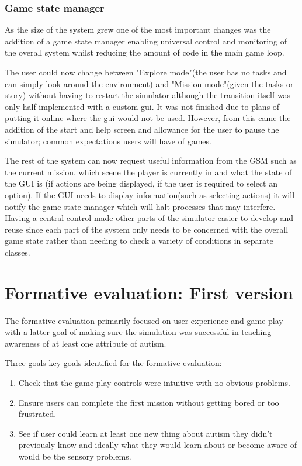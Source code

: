 \documentclass[11pt]{report}
\begin{document}
\subsection{Game state manager}

As the size of the system grew one of the most important changes was the addition of a game state manager enabling universal control and monitoring of the overall system whilst reducing the amount of code in the main game loop. 

The user could now change between "Explore mode"(the user has no tasks and can simply look around the environment) and "Mission mode"(given the tasks or story) without having to restart the simulator although the transition itself was only half implemented with a custom gui. It was not finished due to plans of putting it online where the gui would not be used. However, from this came the addition of the start and help screen and allowance for the user to pause the simulator; common expectations users will have of games.  

The rest of the system can now request useful information from the GSM such as the current mission, which scene the player is currently in and what the state of the GUI is (if actions are being displayed, if the user is required to select an option). If the GUI needs to display information(such as selecting actions) it will notify the game state manager which will halt processes that may interfere. Having a central control made other parts of the simulator easier to develop and reuse since each part of the system only needs to be concerned with the overall game state rather than needing to check a variety of conditions in separate classes.

\chapter{Formative evaluation: First version}
The formative evaluation primarily focused on user experience and game play with a latter goal of making sure the simulation was successful in teaching awareness of at least one attribute of autism. 

Three goals key goals identified for the formative evaluation: 
\begin{enumerate}
\item Check that the game play controls were intuitive with no obvious problems. 
\item Ensure users can complete the first mission without getting bored or too frustrated. 
\item See if user could learn at least one new thing about autism they didn't previously know and ideally what they would learn about or become aware of would be the sensory problems.
\end{enumerate}
\end{document}
